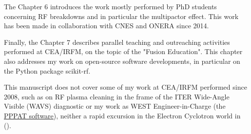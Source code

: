 The Chapter 6 introduces the work mostly performed by PhD students concerning RF breakdowns and in particular the multipactor effect. This work has been made in collaboration with CNES and ONERA since 2014.

Finally, the Chapter 7 describes parallel teaching and outreaching activities performed at CEA/IRFM, on the topic of the "Fusion Education". This chapter also addresses my work on open-source software developments, in particular on the Python package scikit-rf. 

This manuscript does not cover some of my work at CEA/IRFM performed since 2008, such as on RF plasma cleaning in the frame of the ITER Wide-Angle Visible (WAVS) diagnostic or my work as WEST Engineer-in-Charge (the \href{https://github.com/IRFM/PPPAT/}{PPPAT software}), neither a rapid excursion in the Electron Cyclotron world in ().

